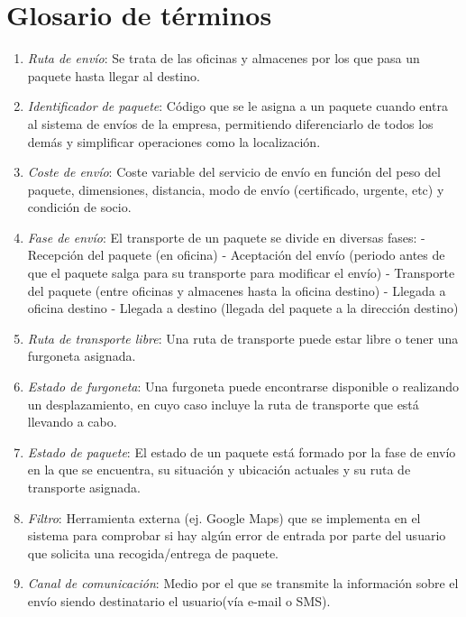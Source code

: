\section{Glosario de términos}
	\begin{enumerate}
		\item \textit{Ruta de envío}: Se trata de las oficinas y almacenes por los que pasa un paquete hasta llegar al destino.
		\item \textit{Identificador de paquete}: Código que se le asigna a un paquete cuando entra al sistema de envíos de la empresa, permitiendo diferenciarlo de todos los demás y simplificar operaciones como la localización.
		\item \textit{Coste de envío}: Coste variable del servicio de envío en función del peso del paquete, dimensiones, distancia, modo de envío (certificado, urgente, etc) y condición de socio.
		\item \textit{Fase de envío}: El transporte de un paquete se divide en diversas fases: \newline - Recepción del paquete (en oficina)
		\newline - Aceptación del envío (periodo antes de que el paquete salga para su transporte para modificar el envío)
		\newline - Transporte del paquete (entre oficinas y almacenes hasta la oficina destino)
		\newline - Llegada a oficina destino
		\newline - Llegada a destino (llegada del paquete a la dirección destino)
		\item \textit{Ruta de transporte libre}: Una ruta de transporte puede estar libre o tener una furgoneta asignada.
		\item \textit{Estado de furgoneta}: Una furgoneta puede encontrarse disponible o realizando un desplazamiento, en cuyo caso incluye la ruta de transporte que está llevando a cabo.
		\item \textit{Estado de paquete}: El estado de un paquete está formado por la fase de envío en la que se encuentra, su situación y ubicación actuales y su ruta de transporte asignada.
		\item \textit{Filtro}: Herramienta externa (ej. Google Maps) que se implementa  en el sistema para comprobar si hay algún error de entrada por parte del usuario que solicita una recogida/entrega de paquete.
		\item \textit{Canal de comunicación}: Medio por el que se transmite la información sobre el envío siendo destinatario el usuario(vía e-mail o SMS).

\end{enumerate}
